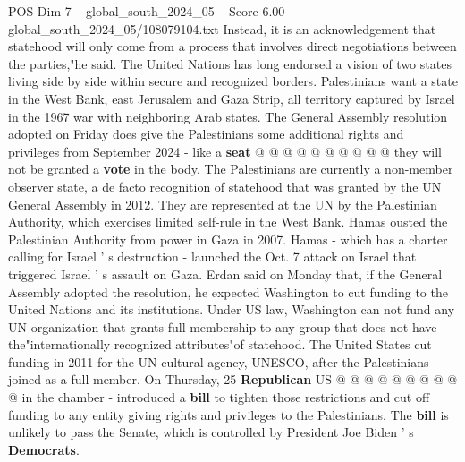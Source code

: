\begin{textsample}{POS Dim 7 – global\_south\_2024\_05 – Score 6.00 – global\_south\_2024\_05/108079104.txt}
Instead, it is an acknowledgement that statehood will only come from a process that involves direct negotiations between the parties,"he said.
The United Nations has long endorsed a vision of two states living side by side within secure and recognized borders.
Palestinians want a state in the West Bank, east Jerusalem and Gaza Strip, all territory captured by Israel in the 1967 war with neighboring Arab states.
The General Assembly resolution adopted on Friday does give the Palestinians some additional rights and privileges from September 2024 - like a \textbf{seat} @ @ @ @ @ @ @ @ @ @ they will not be granted a \textbf{vote} in the body.
The Palestinians are currently a non-member observer state, a de facto recognition of statehood that was granted by the UN General Assembly in 2012.
They are represented at the UN by the Palestinian Authority, which exercises limited self-rule in the West Bank.
Hamas ousted the Palestinian Authority from power in Gaza in 2007.
Hamas - which has a charter calling for Israel ' s destruction - launched the Oct. 7 attack on Israel that triggered Israel ' s assault on Gaza.
Erdan said on Monday that, if the General Assembly adopted the resolution, he expected Washington to cut funding to the United Nations and its institutions.
Under US law, Washington can not fund any UN organization that grants full membership to any group that does not have the"internationally recognized attributes"of statehood.
The United States cut funding in 2011 for the UN cultural agency, UNESCO, after the Palestinians joined as a full member.
On Thursday, 25 \textbf{Republican} US @ @ @ @ @ @ @ @ @ @ in the chamber - introduced a \textbf{bill} to tighten those restrictions and cut off funding to any entity giving rights and privileges to the Palestinians.
The \textbf{bill} is unlikely to pass the Senate, which is controlled by President Joe Biden ' s \textbf{Democrats}.

\end{textsample}
